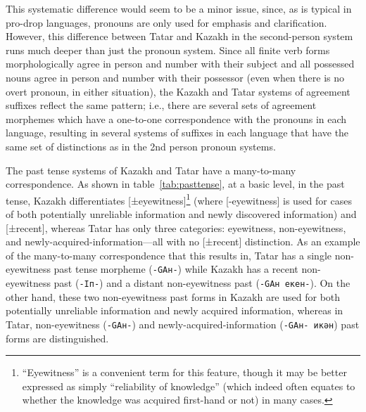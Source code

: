 \documentclass[a4paper,11pt]{article}
\begin{document}
This systematic difference would seem to be a minor issue, since, as is typical in pro-drop languages, pronouns 
are only used for emphasis and clarification.  However, this difference between Tatar and Kazakh in 
the second-person system runs much deeper than just the pronoun system.  Since all finite verb forms 
morphologically agree in person and number with their subject and all possessed nouns agree in person and 
number with their possessor (even when there is no overt pronoun, in either situation), the Kazakh and Tatar 
systems of agreement suffixes reflect the same pattern; i.e., there are several sets of agreement morphemes 
which have a one-to-one correspondence with the pronouns in each language, resulting in several systems of 
suffixes in each language that have the same set of distinctions as in the 2nd person pronoun systems.

The past tense systems of Kazakh and Tatar have a many-to-many correspondence.  As shown 
in table~\ref{tab:pasttense}, at a basic level, in the past tense, Kazakh 
differentiates [±eyewitness]\footnote{``Eyewitness'' is a convenient term for this feature, though it 
may be better expressed as simply ``reliability of knowledge'' (which indeed often equates to whether the 
knowledge was acquired first-hand or not) in many cases.} (where [-eyewitness] is used for cases of both 
potentially unreliable information and newly discovered information) and [±recent], whereas Tatar has only 
three categories: eyewitness, non-eyewitness, and newly-acquired-information---all with no [±recent] distinction.  As 
an example of the many-to-many correspondence that this results in, Tatar has a single non-eyewitness 
past tense morpheme (\texttt{-GAн-}) while Kazakh has a recent non-eyewitness past (\texttt{-Iп-}) and a 
distant non-eyewitness past (\texttt{-GAн екен-}).  On the other hand, these two non-eyewitness past 
forms in Kazakh are used for both potentially unreliable information and newly acquired information, whereas 
in Tatar, non-eyewitness (\texttt{-GAн-}) and newly-acquired-information (\texttt{-GAн- икән}) past forms are distinguished.
\end{document}
